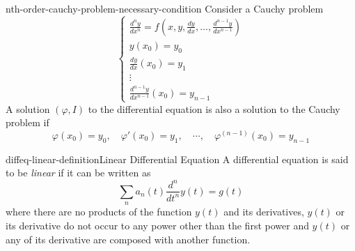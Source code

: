 \documentclass[preview]{standalone}
\begin{document}
\begin{snippetproposition}{nth-order-cauchy-problem-necessary-condition}{}
    Consider a Cauchy problem
    \[
        \begin{cases}
            \frac{d^n y}{dx^n} = f\left(x, y, \frac{dy}{dx}, \ldots, \frac{d^{n-1}y}{dx^{n-1}}\right) \\
            y(x_0) = y_0 \\
            \frac{dy}{dx}(x_0) = y_1 \\
            \vdots \\
            \frac{d^{n-1}y}{dx^{n-1}}(x_0) = y_{n-1}
        \end{cases}
    \]
    A solution \((\varphi, I)\) to the differential equation is also a solution to the Cauchy problem
    if
    \[
        \varphi(x_0) = y_0, \quad \varphi'(x_0) = y_1, \quad \cdots, \quad \varphi^{(n-1)}(x_0) = y_{n-1}
    \]
\end{snippetproposition}

\begin{snippetdefinition}{diffeq-linear-definition}{Linear Differential Equation}
    A differential equation is said to be \textit{linear} if it can be written as
    \[
        \sum_n a_n(t) \frac{d^n}{dt^n}y(t)=g(t)
    \]
    where there are no products of the function \(y(t)\) and its derivatives,
    \(y(t)\) or its derivative do not occur to any power other than the first power
    and \(y(t)\) or any of its derivative are composed with another function.
\end{snippetdefinition}
\end{document}
